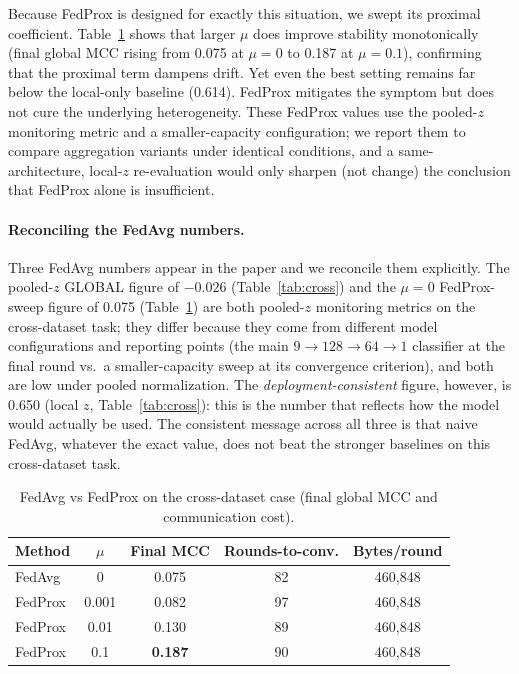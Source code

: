 \documentclass[11pt,a4paper]{article}
\begin{document}
Because FedProx is designed for exactly this situation, we swept its proximal
coefficient. Table~\ref{tab:fedprox} shows that larger \(\mu\) does improve
stability monotonically (final global MCC rising from 0.075 at \(\mu=0\) to 0.187
at \(\mu=0.1\)), confirming that the proximal term dampens drift. Yet even the best
setting remains far below the local-only baseline (0.614). FedProx mitigates the
symptom but does not cure the underlying heterogeneity. These FedProx values use
the pooled-$z$ monitoring metric and a smaller-capacity configuration; we report
them to compare aggregation variants under identical conditions, and a same-%
architecture, local-$z$ re-evaluation would only sharpen (not change) the
conclusion that FedProx alone is insufficient.

\paragraph{Reconciling the FedAvg numbers.} Three FedAvg numbers appear in the
paper and we reconcile them explicitly. The pooled-$z$ GLOBAL figure of
\(-0.026\) (Table~\ref{tab:cross}) and the \(\mu=0\) FedProx-sweep figure of 0.075
(Table~\ref{tab:fedprox}) are both pooled-$z$ monitoring metrics on the
cross-dataset task; they differ because they come from different model
configurations and reporting points (the main \(9\!\to\!128\!\to\!64\!\to\!1\)
classifier at the final round vs.\ a smaller-capacity sweep at its convergence
criterion), and both are low under pooled normalization. The
\emph{deployment-consistent} figure, however, is 0.650 (local $z$,
Table~\ref{tab:cross}): this is the number that reflects how the model would
actually be used. The consistent message across all three is that naive FedAvg,
whatever the exact value, does not beat the stronger baselines on this
cross-dataset task.

\begin{table}[htbp]
\centering\small
\caption{FedAvg vs FedProx on the cross-dataset case (final global MCC and
communication cost).}
\label{tab:fedprox}
\begin{tabular}{@{}lcccc@{}}
\toprule
Method & $\mu$ & Final MCC & Rounds-to-conv. & Bytes/round \\
\midrule
FedAvg          & 0     & 0.075 & 82 & 460{,}848 \\
FedProx         & 0.001 & 0.082 & 97 & 460{,}848 \\
FedProx         & 0.01  & 0.130 & 89 & 460{,}848 \\
FedProx         & 0.1   & \textbf{0.187} & 90 & 460{,}848 \\
\bottomrule
\end{tabular}
\end{table}
\end{document}
